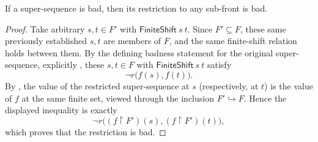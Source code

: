 \begin{lemma}
If a super-sequence is bad, then its restriction to any sub-front is bad.
\end{lemma}
\begin{proof}
Take arbitrary $s,t\in F'$ with $\mathsf{FiniteShift}\ s\ t$.  Since
$F'\subseteq F$, these same previously established $s,t$ are members of
$F$, and the same finite-shift relation holds between them.  By the defining
badness statement for the original super-sequence, explicitly
, these $s,t\in F$ with
$\mathsf{FiniteShift}\ s\ t$ satisfy
\[
\neg r\bigl(f(s),f(t)\bigr).
\]
By , the value of the restricted
super-sequence at $s$ (respectively, at $t$) is the value of $f$ at the same
finite set, viewed through the inclusion $F'\hookrightarrow F$.  Hence the
displayed inequality is exactly
\[
\neg r\bigl((f\!\restriction F')(s),(f\!\restriction F')(t)\bigr),
\]
which proves that the restriction is bad.
\end{proof}
